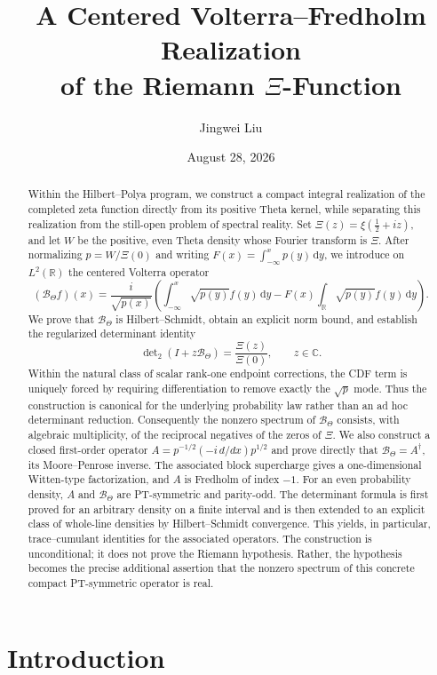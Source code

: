 \documentclass[11pt,reqno]{amsart}
\title[A centered Volterra realization of the Riemann $\Xi$-function]
{A Centered Volterra--Fredholm Realization\\
of the Riemann $\Xi$-Function}
\author{Jingwei Liu}
\date{August 28, 2026}
\numberwithin{equation}{section}
\newcommand{\C}{\mathbb C}
\newcommand{\R}{\mathbb R}
\newcommand{\1}{\mathbf 1}
\newcommand{\BTheta}{\mathcal B_{\Theta}}
\newcommand{\dd}{\,\mathrm d}
\newcommand{\detTwo}{\det\nolimits_{2}}
\begin{document}
\raggedbottom

\begin{abstract}
Within the Hilbert--Polya program, we construct a compact integral realization
of the completed zeta function directly from its positive Theta kernel, while
separating this realization from the still-open problem of spectral reality.
Set $\Xi(z)=\xi(\tfrac12+iz)$, and let $W$ be the positive, even Theta density
whose Fourier transform is $\Xi$.  After normalizing
$p=W/\Xi(0)$ and writing $F(x)=\int_{-\infty}^x p(y)\dd y$, we introduce on
$L^2(\R)$ the centered Volterra operator
\[
 (\BTheta f)(x)=\frac{i}{\sqrt{p(x)}}\left(
 \int_{-\infty}^x\sqrt{p(y)}f(y)\dd y
 -F(x)\int_{\R}\sqrt{p(y)}f(y)\dd y\right).
\]
We prove that $\BTheta$ is Hilbert--Schmidt, obtain an explicit norm bound,
and establish the regularized determinant identity
\[
 \detTwo(I+z\BTheta)=\frac{\Xi(z)}{\Xi(0)},\qquad z\in\C.
\]
Within the natural class of scalar rank-one endpoint corrections, the CDF
term is uniquely forced by requiring differentiation to remove exactly the
$\sqrt p$ mode.  Thus the construction is canonical for the underlying
probability law rather than an ad hoc determinant reduction.
Consequently the nonzero spectrum of $\BTheta$ consists, with algebraic
multiplicity, of the reciprocal negatives of the zeros of $\Xi$.  We also
construct a closed first-order operator
$A=p^{-1/2}(-i\,d/dx)p^{1/2}$ and prove directly that
$\BTheta=A^\dagger$, its Moore--Penrose inverse.  The associated block
supercharge gives a one-dimensional Witten-type factorization, and $A$ is
Fredholm of index $-1$.  For an even probability density, $A$ and
$\BTheta$ are PT-symmetric and parity-odd.  The determinant formula is first
proved for an arbitrary density on a finite interval and is then extended to
an explicit class of whole-line densities by Hilbert--Schmidt convergence.
This yields, in particular, trace--cumulant identities for the associated
operators.  The construction is unconditional; it does not prove the Riemann
hypothesis.  Rather, the hypothesis becomes the precise additional assertion
that the nonzero spectrum of this concrete compact PT-symmetric operator is
real.
\end{abstract}

\maketitle

\section{Introduction}
\end{document}
